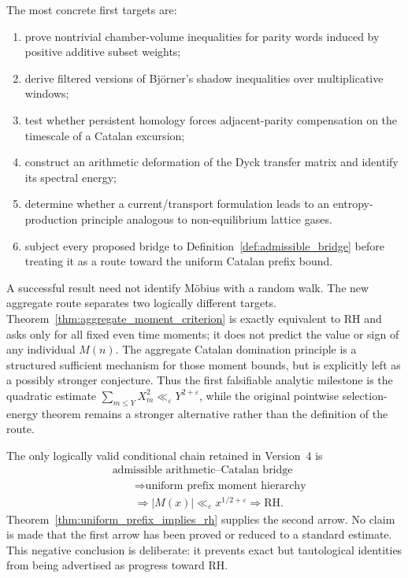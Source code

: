 \documentclass[11pt]{amsart}
\numberwithin{equation}{section}
\theoremstyle{plain}
\theoremstyle{definition}
\theoremstyle{remark}
\newcommand{\Mert}{M}
\newcommand{\eps}{\varepsilon}
\begin{document}
The most concrete first targets are:
\begin{enumerate}[label=(\roman*)]
\item prove nontrivial chamber-volume inequalities for parity words induced by positive additive subset weights;
\item derive filtered versions of Bj\"orner's shadow inequalities over multiplicative windows;
\item test whether persistent homology forces adjacent-parity compensation on the timescale of a Catalan excursion;
\item construct an arithmetic deformation of the Dyck transfer matrix and identify its spectral energy;
\item determine whether a current/transport formulation leads to an entropy-production principle analogous to non-equilibrium lattice gases.
\item subject every proposed bridge to Definition~\ref{def:admissible_bridge}
      before treating it as a route toward the uniform Catalan prefix bound.
\end{enumerate}

A successful result need not identify M\"obius with a random walk.  The new
aggregate route separates two logically different targets.  Theorem~\ref{thm:aggregate_moment_criterion}
is exactly equivalent to RH and asks only for all fixed even time moments; it
does not predict the value or sign of any individual $M(n)$.  The aggregate
Catalan domination principle is a structured sufficient mechanism for those
moment bounds, but is explicitly left as a possibly stronger conjecture.  Thus
the first falsifiable analytic milestone is the quadratic estimate
$\sum_{m\le Y}X_m^2\ll_\varepsilon Y^{2+\varepsilon}$, while the original
pointwise selection-energy theorem remains a stronger alternative rather than
the definition of the route.

The only logically valid conditional chain retained in Version~4 is
\begin{equation}
\begin{aligned}
&\text{admissible arithmetic--Catalan bridge}\\
&\qquad\Longrightarrow \text{uniform prefix moment hierarchy}\\
&\qquad\Longrightarrow
|\Mert(x)|\ll_\eps x^{1/2+\eps}
\Longrightarrow \mathrm{RH}.
\end{aligned}
\end{equation}
Theorem~\ref{thm:uniform_prefix_implies_rh} supplies the second arrow.  No
claim is made that the first arrow has been proved or reduced to a standard
estimate.  This negative conclusion is deliberate: it prevents exact but
tautological identities from being advertised as progress toward RH.
\end{document}
